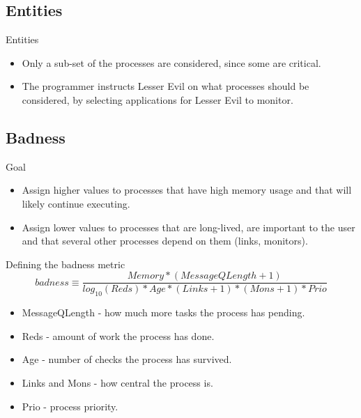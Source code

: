\documentclass{beamer}
\begin{document}
\subsection{Entities}
\begin{frame}{Entities}
\begin{itemize}

\item Only a sub-set of the processes are considered, since some are critical.
\item The programmer instructs Lesser Evil on what processes should be considered, by selecting applications for Lesser Evil to monitor.

\end{itemize}
\end{frame}

\subsection{Badness}
\begin{frame}{Goal}
\begin{itemize}

\item Assign higher values to processes that have high memory usage and that will likely continue executing.
\item Assign lower values to processes that are long-lived, are important to the user and that several other processes depend on them (links, monitors).

\end{itemize}
\end{frame}


\begin{frame}{Defining the badness metric}
$$
\mathit{badness} \equiv \frac{\mathit{Memory} * (\mathit{MessageQLength}+1)}{log_{10}(\mathit{Reds})*\mathit{Age}*(\mathit{Links}+1)*(\mathit{Mons}+1)*\mathit{Prio}}
$$

\begin{itemize}

\item MessageQLength - how much more tasks the process has pending.
\item Reds - amount of work the process has done.
\item Age - number of checks the process has survived.
\item Links and Mons - how central the process is.
\item Prio - process priority.

\end{itemize}


\end{frame}
\end{document}
